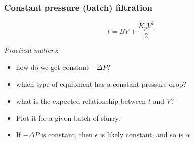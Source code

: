 \begin{frame}\frametitle{Constant pressure (batch) filtration}
	\[ t = BV +  \dfrac{K_pV^2}{2} \]
	\vspace{12pt}

	\emph{Practical matters}:
	\begin{itemize}
		\item	how do we get constant $-\Delta P$?
		\item	which type of equipment has a constant pressure drop?
		\item	what is the expected relationship between $t$ and $V$?
		\item	Plot it for a given batch of slurry.
		\item	If $-\Delta P$ is constant, then $\epsilon$ is likely constant, and so is $\alpha$
	\end{itemize}
\end{frame}

